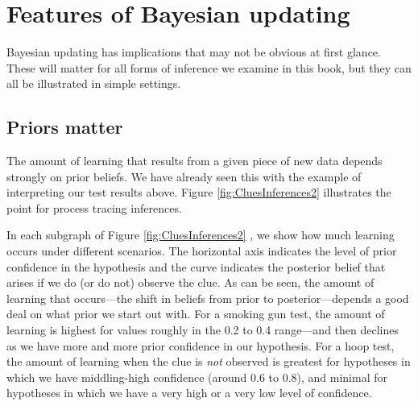 \documentclass[
  12pt,
]{book}
\begin{document}
\hypertarget{features-of-bayesian-updating}{%
\section{Features of Bayesian updating}\label{features-of-bayesian-updating}}

Bayesian updating has implications that may not be obvious at first glance. These will matter for all forms of inference we examine in this book, but they can all be illustrated in simple settings.

\hypertarget{AppPriors}{%
\subsection{Priors matter}\label{AppPriors}}

The amount of learning that results from a given piece of new data depends strongly on prior beliefs. We have already seen this with the example of interpreting our test results above. Figure \ref{fig:CluesInferences2} illustrates the point for process tracing inferences.

In each subgraph of Figure \ref{fig:CluesInferences2} , we show how much learning occurs under different scenarios. The horizontal axis indicates the level of prior confidence in the hypothesis and the curve indicates the posterior belief that arises if we do (or do not) observe the clue. As can be seen, the amount of learning that occurs---the shift in beliefs from prior to posterior---depends a good deal on what prior we start out with. For a smoking gun test, the amount of learning is highest for values roughly in the 0.2 to 0.4 range---and then declines as we have more and more prior confidence in our hypothesis. For a hoop test, the amount of learning when the clue is \emph{not} observed is greatest for hypotheses in which we have middling-high confidence (around 0.6 to 0.8), and minimal for hypotheses in which we have a very high or a very low level of confidence.
\end{document}

